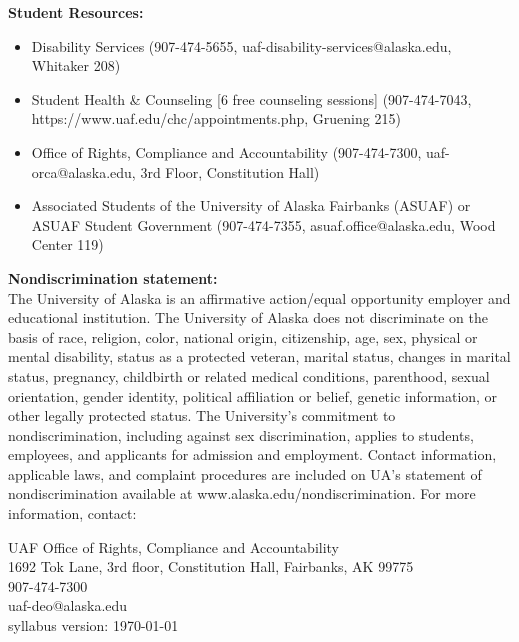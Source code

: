 \documentclass[12pt]{article}
\renewcommand{\emph}[1]{\textsf{\textbf{#1}}}
\newcommand{\localhead}[1]{\par\smallskip\textbf{#1}\nobreak\\}%
\def\subheading#1{\localhead{\emph{#1}}}
\begin{document}
\subheading{Student Resources:}
\begin{itemize}
\item Disability Services (907-474-5655, uaf-disability-services@alaska.edu, Whitaker 208) 
\item Student Health \& Counseling [6 free counseling sessions] (907-474-7043, https://www.uaf.edu/chc/appointments.php, Gruening 215)
\item Office of Rights, Compliance and Accountability (907-474-7300, uaf-orca@alaska.edu, 3rd Floor, Constitution Hall)
\item Associated Students of the University of Alaska Fairbanks (ASUAF) or ASUAF Student Government (907-474-7355, asuaf.office@alaska.edu, Wood Center 119)
\end{itemize}


\subheading{Nondiscrimination statement:} The University of Alaska is an affirmative action/equal opportunity employer and educational institution. The University of Alaska does not discriminate on the basis of race, religion, color, national origin, citizenship, age, sex, physical or mental disability, status as a protected veteran, marital status, changes in marital status, pregnancy, childbirth or related medical conditions, parenthood, sexual orientation, gender identity, political affiliation or belief, genetic information, or other legally protected status. The University's commitment to nondiscrimination, including against sex discrimination, applies to students, employees, and applicants for admission and employment. Contact information, applicable laws, and complaint procedures are included on UA's statement of nondiscrimination available at www.alaska.edu/nondiscrimination. For more information, contact: 

UAF Office of Rights, Compliance and Accountability\\
1692 Tok Lane, 3rd floor, Constitution Hall, Fairbanks, AK  99775\\
907-474-7300\\
uaf-deo@alaska.edu\\

 \scriptsize syllabus version: \today \normalsize
\end{document}
